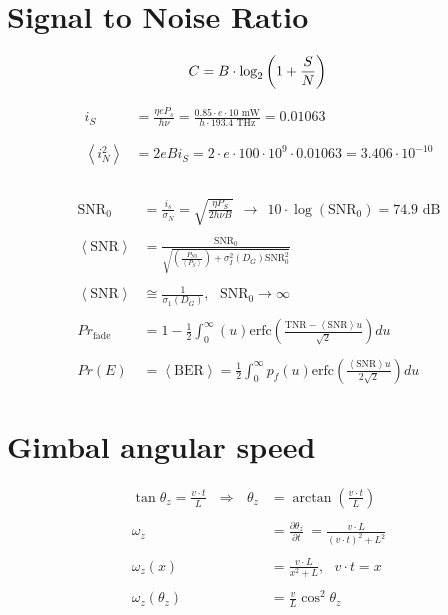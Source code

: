 \documentclass[a4paper]{article}
\begin{document}
\section{Signal to Noise Ratio}
\begin{equation*}
C = B\cdot \textrm{log}_2\left(1+\frac{S}{N}\right) \\
\end{equation*}

\begin{align*}
i_S &= \frac{\eta e P_s}{h\nu} = \frac{0.85\cdot e \cdot 10 \textrm{ mW}}{h\cdot 193.4 \textrm{ THz}} = 0.01063\\
\\
\\
\left\langle i_N^2 \right\rangle &= 2eBi_S = 2\cdot e \cdot 100\cdot 10^{9}\cdot 0.01063 = 3.406\cdot 10^{-10}
\\
\\
\end{align*}

\begin{align*}
\textrm{SNR}_0 &= \frac{i_s}{\sigma_N} = \sqrt{\frac{\eta P_S}{2h\nu B}} \ \ \rightarrow \ \ 10\cdot \log(\textrm{SNR}_0) = 74.9 \textrm{ dB}
\\
\\
\left\langle\textrm{SNR}\right\rangle &= \frac{\textrm{SNR}_0}{\sqrt{\left(\frac{P_{S0}}{\left\langle P_S\right\rangle}\right)+\sigma_I^2(D_G)\textrm{SNR}_0^2}}
\\
\\
\left\langle\textrm{SNR}\right\rangle &\cong \frac{1}{\sigma_1(D_G)}, \ \ \ \textrm{SNR}_0 \rightarrow \infty
\\
\\
Pr_{\textrm{fade}} &= 1 -\frac{1}{2}\int_0^\infty (u)\textrm{erfc}\left(\frac{\textrm{TNR}-\left\langle \textrm{SNR}\right\rangle u}{\sqrt{2}}\right)du
\\
\\
Pr(E) &= \left\langle \textrm{BER} \right\rangle = \frac{1}{2}\int_0^\infty p_f(u)\textrm{erfc}\left(\frac{\left\langle \textrm{SNR}\right\rangle u}{2\sqrt{2}}\right)du
\end{align*}

\section{Gimbal angular speed}

\begin{align*}
\tan \theta_z = \frac{v\cdot t}{L}\ \ \  \Rightarrow \ \ \  \theta_z &= \arctan \left(\frac{v\cdot t}{L} \right)\\
\\
\omega_z &= \frac{\partial \theta_z}{\partial t} \ = \frac{v\cdot L}{(v\cdot t)^2 + L^2} \\
\\
\omega_z(x) &= \frac{v\cdot L}{x^2 + L} , \ \ \ v\cdot t  = x \\
\\
\omega_z(\theta_z) &= \frac{v}{L}\cos^2\theta_z\\
\end{align*}
\end{document}
